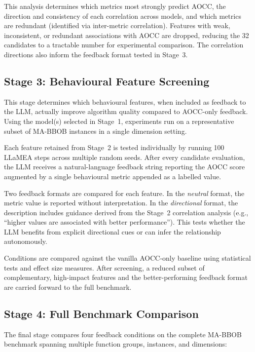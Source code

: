 \documentclass[12pt]{article}
\begin{document}
This analysis determines which metrics most strongly predict AOCC, the direction and consistency of each correlation across models, and which metrics are redundant (identified via inter-metric correlation). Features with weak, inconsistent, or redundant associations with AOCC are dropped, reducing the 32 candidates to a tractable number for experimental comparison. The correlation directions also inform the feedback format tested in Stage~3.

\subsection{Stage 3: Behavioural Feature Screening}

This stage determines which behavioural features, when included as feedback to the LLM, actually improve algorithm quality compared to AOCC-only feedback. Using the model(s) selected in Stage~1, experiments run on a representative subset of MA-BBOB instances in a single dimension setting.

Each feature retained from Stage~2 is tested individually by running 100 LLaMEA steps across multiple random seeds. After every candidate evaluation, the LLM receives a natural-language feedback string reporting the AOCC score augmented by a single behavioural metric appended as a labelled value.

Two feedback formats are compared for each feature. In the \emph{neutral} format, the metric value is reported without interpretation. In the \emph{directional} format, the description includes guidance derived from the Stage~2 correlation analysis (e.g., ``higher values are associated with better performance''). This tests whether the LLM benefits from explicit directional cues or can infer the relationship autonomously.

Conditions are compared against the vanilla AOCC-only baseline using statistical tests and effect size measures. After screening, a reduced subset of complementary, high-impact features and the better-performing feedback format are carried forward to the full benchmark.

\subsection{Stage 4: Full Benchmark Comparison}

The final stage compares four feedback conditions on the complete MA-BBOB benchmark spanning multiple function groups, instances, and dimensions:
\end{document}
